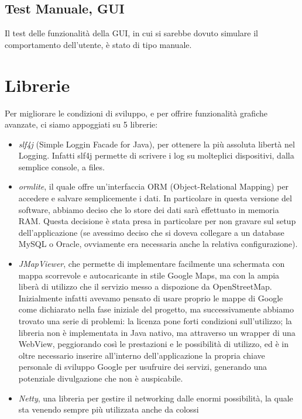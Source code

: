 \documentclass[a4paper,12pt]{report}
\begin{document}
  \subsection{Test Manuale, GUI}
    Il test delle funzionalità della GUI, in cui si sarebbe dovuto simulare il 
    comportamento dell'utente, è stato di tipo manuale. 

\section{Librerie}

  Per migliorare le condizioni di sviluppo, e per offrire funzionalità grafiche 
avanzate, ci siamo appoggiati su 5 librerie:
  \begin{itemize}
    \item \textit{slf4j} (Simple Loggin Facade for Java), per ottenere la più 
assoluta libertà nel Logging. Infatti slf4j permette di scrivere i log su 
molteplici dispositivi, dalla semplice console, a files.
    \item \textit{ormlite}, il quale offre un'interfaccia ORM (Object-Relational 
Mapping) per accedere e salvare semplicemente i dati. In particolare in questa 
versione del software, abbiamo deciso che lo store dei dati sarà effettuato in 
memoria RAM. 
Questa decisione è stata presa in particolare per non gravare sul setup 
dell'applicazione (se avessimo deciso che si doveva collegare a un database 
MySQL o Oracle, ovviamente era necessaria anche la relativa configurazione).
    \item \textit{JMapViewer}, che permette di implementare facilmente una 
schermata con mappa scorrevole e autocaricante in stile Google Maps, ma con la
ampia liberà di utilizzo che il servizio messo a dispozione da OpenStreetMap. 
Inizialmente infatti avevamo pensato di usare proprio le mappe di Google come
dichiarato nella fase iniziale del progetto, ma successivamente 
abbiamo trovato una serie di problemi: la licenza pone forti condizioni 
sull'utilizzo; la libreria non è implementata in Java nativo, ma attraverso 
un wrapper di una WebView, peggiorando così le prestazioni e le possibilità di 
utilizzo, ed è in oltre necessario inserire all'interno dell'applicazione la 
propria chiave personale di sviluppo Google per usufruire dei servizi, 
generando una potenziale divulgazione che non è auspicabile.  
    \item \textit{Netty}, una libreria per gestire il networking dalle enormi 
possibilità, la quale sta venendo sempre più utilizzata anche da colossi 

\end{itemize}
\end{document}
